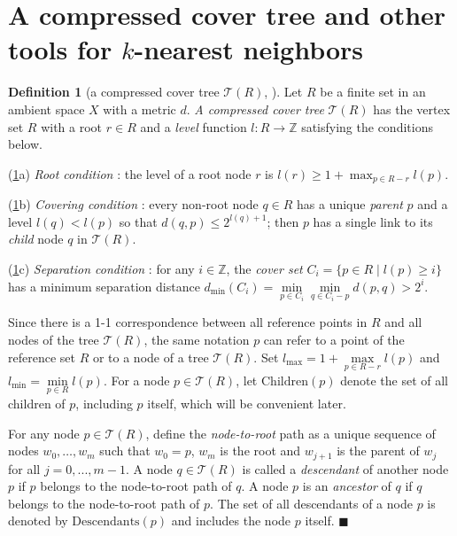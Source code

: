 \documentclass[a4paper,UKenglish,cleveref, autoref]{lipics-v2019}
\numberwithin{algocf}{section}
\theoremstyle{definition}
\newtheorem{dfn}[algocf]{Definition}
\theoremstyle{definition}
\theoremstyle{definition}
\theoremstyle{plain}
\newcommand{\Child}{\mathrm{Children}}
\newcommand{\Desc}{\mathrm{Descendants}}
\newcommand{\Z}{\mathbb{Z}}
\newcommand{\T}{\mathcal{T}}
\newcommand{\bs}{\hfill $\blacksquare$}
\begin{document}
\section{A compressed cover tree and other tools for $k$-nearest neighbors}
\label{sec:cover_tree}


\begin{dfn}[a compressed cover tree $\T(R)$, {\cite[Definition~2.1]{elkin2021new}}]
\label{dfn:cover_tree_compressed}
Let $R$ be a finite set in an ambient space $X$ with a metric $d$. 
 \emph{A compressed cover tree} $\T(R)$ has the vertex set $R$ with a root $r \in R$ and a \emph{level} function $l : R \rightarrow \Z$ satisfying the conditions below.
\medskip
 
\noindent
(\ref{dfn:cover_tree_compressed}a)
\emph{Root condition} :  
the level of a root node $r$ is $l(r) \geq 1 +  \max_{p \in R-r}l(p)$.
\medskip

\noindent
(\ref{dfn:cover_tree_compressed}b)
\emph{Covering condition} : 
every non-root node $q \in R$ has a unique \emph{parent} $p$ and a level $l(q)<l(p)$ so that $d(q,p) \leq 2^{l(q)+1}$; 
then $p$ has a single link to its \emph{child} node $q$ in $\T(R)$. 
\medskip

\noindent
(\ref{dfn:cover_tree_compressed}c)
\emph{Separation condition} : 
for any $i \in \Z$, the \emph{cover set} $C_i = \{p \in R \mid l(p) \geq i\}$ has a minimum separation distance
$d_{\min}(C_i)
     = \min\limits_{p \in C_{i}}\min\limits_{q \in C_{i}-p} d(p,q) > 2^{i}$.
\medskip

\noindent
Since there is a 1-1 correspondence between all reference points in $R$ and all nodes of the tree $\T(R)$, the same notation $p$ can refer to a point of the reference set $R$ or to a node of a tree $\T(R)$.  
Set $l_{\max} = 1 +  \max\limits_{p \in R-r}l(p) $ and $l_{\min} = \min\limits_{p \in R}l(p)$.
For a node $p\in\T(R)$, let $\Child(p)$ denote the set of all children of $p$, including $p$ itself, which will be convenient later.
\medskip
 
For any node $p \in\T(R)$, define the \emph{node-to-root} path as a unique sequence of nodes $w_0,\dots,w_m$ such that $w_0 = p$, $w_m$ is the root and $w_{j+1}$ is the parent of $w_{j}$ for all $j=0,...,m-1$. 
A node $q \in\T(R)$ is called a \emph{descendant} of another node $p$ if $p$ belongs to the node-to-root path of $q$. 
A node $p$ is an \emph{ancestor} of $q$ if $q$ belongs to the node-to-root path of $p$. 
The set of all descendants of a node $p$ is denoted by $\Desc(p)$ and includes the node $p$ itself. 
\bs
\end{dfn} 
\end{document}
